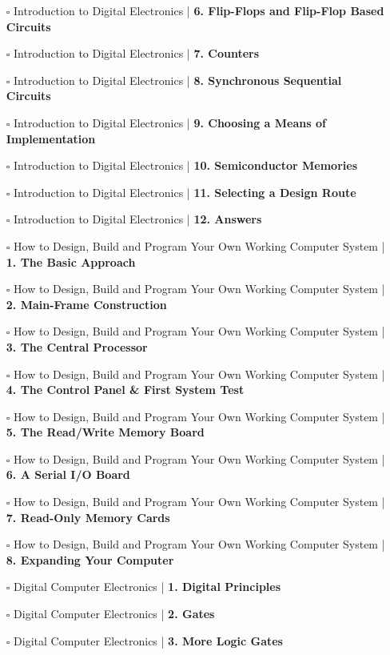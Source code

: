 \documentclass[a4, landscape, 12pt]{article}
\newcommand{\checkbox}{$\square$}%
\begin{document}
\begin{itemize}
{}
\item [\checkbox]  Introduction to Digital Electronics | \textbf{ 6. Flip-Flops and Flip-Flop Based Circuits
}
\item [\checkbox]  Introduction to Digital Electronics | \textbf{ 7. Counters
}
\item [\checkbox]  Introduction to Digital Electronics | \textbf{ 8. Synchronous Sequential Circuits
}
\item [\checkbox]  Introduction to Digital Electronics | \textbf{ 9. Choosing a Means of Implementation
}
\item [\checkbox]  Introduction to Digital Electronics | \textbf{ 10. Semiconductor Memories
}
\item [\checkbox]  Introduction to Digital Electronics | \textbf{ 11. Selecting a Design Route
}
\item [\checkbox]  Introduction to Digital Electronics | \textbf{ 12. Answers
}
\item [\checkbox]  How to Design, Build and Program Your Own Working Computer System  | \textbf{ 1. The Basic Approach
}
\item [\checkbox]  How to Design, Build and Program Your Own Working Computer System  | \textbf{ 2. Main-Frame Construction
}
\item [\checkbox]  How to Design, Build and Program Your Own Working Computer System  | \textbf{ 3. The Central Processor
}
\item [\checkbox]  How to Design, Build and Program Your Own Working Computer System  | \textbf{ 4. The Control Panel & First System Test
}
\item [\checkbox]  How to Design, Build and Program Your Own Working Computer System  | \textbf{ 5. The Read/Write Memory Board
}
\item [\checkbox]  How to Design, Build and Program Your Own Working Computer System  | \textbf{ 6. A Serial I/O Board
}
\item [\checkbox]  How to Design, Build and Program Your Own Working Computer System  | \textbf{ 7. Read-Only Memory Cards
}
\item [\checkbox]  How to Design, Build and Program Your Own Working Computer System  | \textbf{ 8. Expanding Your Computer
}
\item [\checkbox]  Digital Computer Electronics | \textbf{ 1. Digital Principles
}
\item [\checkbox]  Digital Computer Electronics | \textbf{ 2. Gates
}
\item [\checkbox]  Digital Computer Electronics | \textbf{ 3. More Logic Gates
}
\end{itemize}
\end{document}
